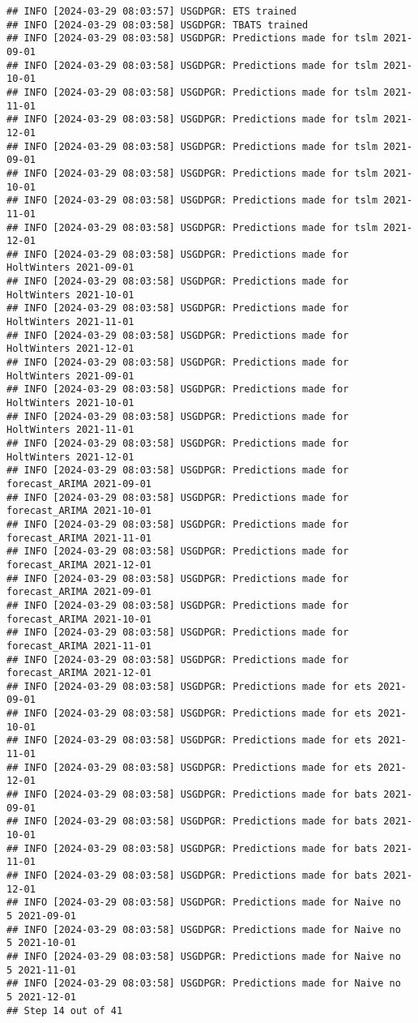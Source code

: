 \documentclass[
]{article}
\begin{document}
\begin{verbatim}
## INFO [2024-03-29 08:03:57] USGDPGR: ETS trained
## INFO [2024-03-29 08:03:58] USGDPGR: TBATS trained
## INFO [2024-03-29 08:03:58] USGDPGR: Predictions made for tslm 2021-09-01
## INFO [2024-03-29 08:03:58] USGDPGR: Predictions made for tslm 2021-10-01
## INFO [2024-03-29 08:03:58] USGDPGR: Predictions made for tslm 2021-11-01
## INFO [2024-03-29 08:03:58] USGDPGR: Predictions made for tslm 2021-12-01
## INFO [2024-03-29 08:03:58] USGDPGR: Predictions made for tslm 2021-09-01
## INFO [2024-03-29 08:03:58] USGDPGR: Predictions made for tslm 2021-10-01
## INFO [2024-03-29 08:03:58] USGDPGR: Predictions made for tslm 2021-11-01
## INFO [2024-03-29 08:03:58] USGDPGR: Predictions made for tslm 2021-12-01
## INFO [2024-03-29 08:03:58] USGDPGR: Predictions made for HoltWinters 2021-09-01
## INFO [2024-03-29 08:03:58] USGDPGR: Predictions made for HoltWinters 2021-10-01
## INFO [2024-03-29 08:03:58] USGDPGR: Predictions made for HoltWinters 2021-11-01
## INFO [2024-03-29 08:03:58] USGDPGR: Predictions made for HoltWinters 2021-12-01
## INFO [2024-03-29 08:03:58] USGDPGR: Predictions made for HoltWinters 2021-09-01
## INFO [2024-03-29 08:03:58] USGDPGR: Predictions made for HoltWinters 2021-10-01
## INFO [2024-03-29 08:03:58] USGDPGR: Predictions made for HoltWinters 2021-11-01
## INFO [2024-03-29 08:03:58] USGDPGR: Predictions made for HoltWinters 2021-12-01
## INFO [2024-03-29 08:03:58] USGDPGR: Predictions made for forecast_ARIMA 2021-09-01
## INFO [2024-03-29 08:03:58] USGDPGR: Predictions made for forecast_ARIMA 2021-10-01
## INFO [2024-03-29 08:03:58] USGDPGR: Predictions made for forecast_ARIMA 2021-11-01
## INFO [2024-03-29 08:03:58] USGDPGR: Predictions made for forecast_ARIMA 2021-12-01
## INFO [2024-03-29 08:03:58] USGDPGR: Predictions made for forecast_ARIMA 2021-09-01
## INFO [2024-03-29 08:03:58] USGDPGR: Predictions made for forecast_ARIMA 2021-10-01
## INFO [2024-03-29 08:03:58] USGDPGR: Predictions made for forecast_ARIMA 2021-11-01
## INFO [2024-03-29 08:03:58] USGDPGR: Predictions made for forecast_ARIMA 2021-12-01
## INFO [2024-03-29 08:03:58] USGDPGR: Predictions made for ets 2021-09-01
## INFO [2024-03-29 08:03:58] USGDPGR: Predictions made for ets 2021-10-01
## INFO [2024-03-29 08:03:58] USGDPGR: Predictions made for ets 2021-11-01
## INFO [2024-03-29 08:03:58] USGDPGR: Predictions made for ets 2021-12-01
## INFO [2024-03-29 08:03:58] USGDPGR: Predictions made for bats 2021-09-01
## INFO [2024-03-29 08:03:58] USGDPGR: Predictions made for bats 2021-10-01
## INFO [2024-03-29 08:03:58] USGDPGR: Predictions made for bats 2021-11-01
## INFO [2024-03-29 08:03:58] USGDPGR: Predictions made for bats 2021-12-01
## INFO [2024-03-29 08:03:58] USGDPGR: Predictions made for Naive no  5 2021-09-01
## INFO [2024-03-29 08:03:58] USGDPGR: Predictions made for Naive no  5 2021-10-01
## INFO [2024-03-29 08:03:58] USGDPGR: Predictions made for Naive no  5 2021-11-01
## INFO [2024-03-29 08:03:58] USGDPGR: Predictions made for Naive no  5 2021-12-01
## Step 14 out of 41
\end{verbatim}
\end{document}
